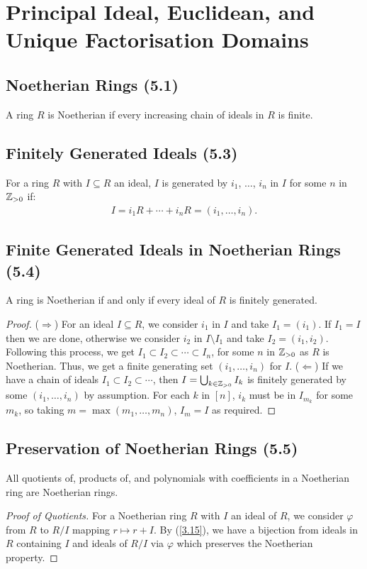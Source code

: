 \section{Principal Ideal, Euclidean, and Unique Factorisation Domains}

\subsection{Noetherian Rings (5.1)} \label{5.1}

A ring $R$ is Noetherian if every increasing chain of ideals in $R$
is finite.

\subsection{Finitely Generated Ideals (5.3)} \label{5.3}

For a ring $R$ with $I \subseteq R$ an ideal, $I$ is generated by
$i_1$, $\ldots$, $i_n$ in $I$ for some $n$ in $\mathbb{Z}_{>0}$ if:
\begin{align*}
    I = i_1R + \cdots + i_nR = (i_1, \ldots, i_n).
\end{align*}

\subsection{Finite Generated Ideals in Noetherian Rings (5.4)} \label{5.4}

A ring is Noetherian if and only if every ideal of $R$ is finitely
generated.

\begin{proof}
    ($\Longrightarrow$) For an ideal $I \subseteq R$, we consider
    $i_1$ in $I$ and take $I_1 = (i_1)$. If $I_1 = I$ then we are
    done, otherwise we consider $i_2$ in $I \setminus I_1$ and
    take $I_2 = (i_1, i_2)$. Following this process, we get
    $I_1 \subset I_2 \subset \cdots \subset I_n$, for some $n$ in
    $\mathbb{Z}_{>0}$ as $R$ is Noetherian. Thus, we get a finite 
    generating set $(i_1, \ldots, i_n)$ for $I$.
    \bs
    ($\Longleftarrow$) If we have a chain of ideals
    $I_1 \subset I_2 \subset \cdots$, then 
    $I = \bigcup_{k \in \mathbb{Z}_{>0}} I_k$ is finitely generated
    by some $(i_1, \ldots, i_n)$ by assumption. For each $k$ in
    $[n]$, $i_k$ must be in $I_{m_k}$ for some $m_k$, so
    taking $m = \max(m_1, \ldots, m_n)$, $I_m = I$ as required.
\end{proof}

\subsection{Preservation of Noetherian Rings (5.5)} \label{5.5}

All quotients of, products of, and polynomials with coefficients
in a Noetherian ring are Noetherian rings.

\begin{proof}[Proof of Quotients]
    For a Noetherian ring $R$ with $I$ an ideal of $R$, we consider
    $\varphi$ from $R$ to $R / I$ mapping $r \mapsto r + I$.
    By (\ref{3.15}), we have a bijection from ideals
    in $R$ containing $I$ and ideals of $R / I$ via $\varphi$
    which preserves the Noetherian property.
\end{proof}